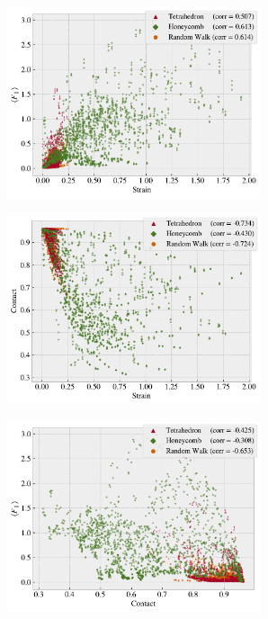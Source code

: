 \begin{figure}[H]
  \centering
  \begin{subfigure}[t]{0.49\textwidth}
      \centering
      \raggedleft
      \includegraphics[width=0.82\textwidth]{figures/ML/corr_stretch_Ff.pdf}
      \caption{}
  \end{subfigure}
  \hfill
  \begin{subfigure}[t]{0.49\textwidth}
      \centering
      \raggedright
      \includegraphics[width=0.82\textwidth]{figures/ML/corr_stretch_contact.pdf}
      \caption{}
  \end{subfigure}
  \hfill
  \begin{subfigure}[t]{0.49\textwidth}
      \centering
      \raggedleft
      \includegraphics[width=0.82\textwidth]{figures/ML/corr_contact_Ff.pdf}

\end{subfigure}
\end{figure}
